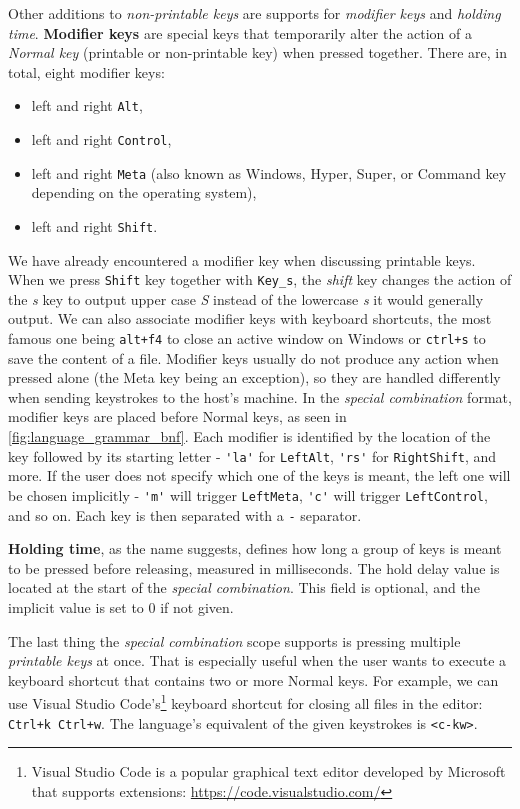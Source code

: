 Other additions to \emph{non-printable keys} are supports for \emph{modifier keys} and \emph{holding time}. \textbf{Modifier keys} are special keys that temporarily alter the action of a \emph{Normal key} (printable or non-printable key) when pressed together. There are, in total, eight modifier keys:
\begin{itemize}
    \item left and right \verb|Alt|,
    \item left and right \verb|Control|,
    \item left and right \verb|Meta| (also known as Windows, Hyper, Super, or Command key depending on the operating system),
    \item left and right \verb|Shift|.
\end{itemize}
 We have already encountered a modifier key when discussing printable keys. When we press \verb|Shift| key together with \verb|Key_s|, the \emph{shift} key changes the action of the \emph{s} key to output upper case \emph{S} instead of the lowercase \emph{s} it would generally output. We can also associate modifier keys with keyboard shortcuts, the most famous one being \verb|alt+f4| to close an active window on Windows or \verb|ctrl+s| to save the content of a file. Modifier keys usually do not produce any action when pressed alone (the Meta key being an exception), so they are handled differently when sending keystrokes to the host's machine. In the \emph{special combination} format, modifier keys are placed before Normal keys, as seen in \autoref{fig:language_grammar_bnf}. Each modifier is identified by the location of the key followed by its starting letter \-- \verb|'la'| for \verb|LeftAlt|, \verb|'rs'| for \verb|RightShift|, and more. If the user does not specify which one of the keys is meant, the left one will be chosen implicitly \-- \verb|'m'| will trigger \verb|LeftMeta|, \verb|'c'| will trigger \verb|LeftControl|, and so on. Each key is then separated with a \verb|-| separator.

\textbf{Holding time}, as the name suggests, defines how long a group of keys is meant to be pressed before releasing, measured in milliseconds. The hold delay value is located at the start of the \emph{special combination}. This field is optional, and the implicit value is set to 0 if not given.

The last thing the \emph{special combination} scope supports is pressing multiple \emph{printable keys} at once. That is especially useful when the user wants to execute a keyboard shortcut that contains two or more Normal keys. For example, we can use Visual Studio Code's\footnote{Visual Studio Code is a popular graphical text editor developed by Microsoft that supports extensions: \url{https://code.visualstudio.com/}} keyboard shortcut for closing all files in the editor: \verb|Ctrl+k Ctrl+w|. The language's equivalent of the given keystrokes is \verb|<c-kw>|.

